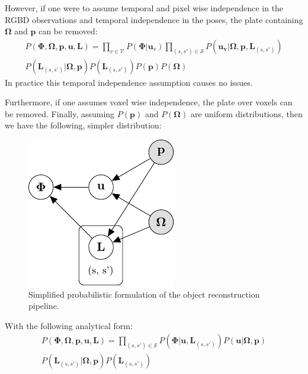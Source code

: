 However, if one were to assume temporal and pixel wise independence in the RGBD observations and temporal independence in 
the poses, the plate containing $\mathbf{\Omega}$ and $\mathbf{p}$ can be removed:
\begin{equation}
\begin{split}
P(\mathbf{\Phi}, \mathbf{\Omega}, \mathbf{p}, \mathbf{u}, \mathbf{L}) = 
\prod_{v \in \mathcal{V}}P(\mathbf{\Phi}|\mathbf{u}_{v})
\prod_{(s, s') \in \mathcal{S}}P(\mathbf{u_{v}}|\mathbf{\Omega}, \mathbf{p}, \mathbf{L}_{(s, s')})\\
P(\mathbf{L}_{(s, s')}|\mathbf{\Omega}, \mathbf{p}) P(\mathbf{L}_{(s, s')})P(\mathbf{p})P(\mathbf{\Omega})
\end{split}
\end{equation}
In practice this temporal independence assumption causes no issues.

Furthermore, if one assumes voxel wise independence, the plate over voxels can be removed. Finally, assuming $P(\mathbf{p})$ and 
$P(\mathbf{\Omega})$ are uniform distributions, then we have the following, simpler distribution:
\begin{figure}[h]
	\centering
	\includegraphics{graphical_models/pgm2.pdf}
	\caption{Simplified probabilistic formulation of the object reconstruction pipeline.}
\end{figure}

With the following analytical form:
\begin{equation}
\begin{split}
P(\mathbf{\Phi}, \mathbf{\Omega}, \mathbf{p}, \mathbf{u}, \mathbf{L}) = 
\prod_{(s, s') \in \mathcal{S}} P(\mathbf{\Phi}|\mathbf{u}, \mathbf{L}_{(s, s')})
P(\mathbf{u}|\mathbf{\Omega}, \mathbf{p})\\
P(\mathbf{L}_{(s, s')}|\mathbf{\Omega}, \mathbf{p})
P(\mathbf{L}_{(s, s')})
\end{split}
\end{equation}

